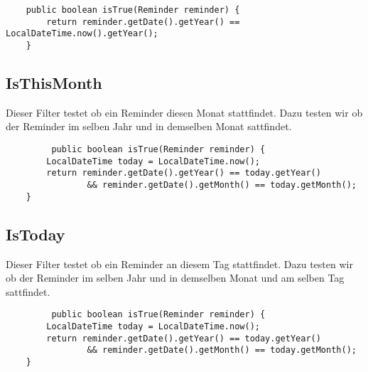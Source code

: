     \begin{lstlisting}
    public boolean isTrue(Reminder reminder) {
        return reminder.getDate().getYear() == LocalDateTime.now().getYear();
    }
    \end{lstlisting}


    \subsection{IsThisMonth}
    Dieser Filter testet ob ein Reminder diesen Monat stattfindet. Dazu  testen wir ob der Reminder im selben Jahr und in demselben Monat sattfindet.
    \begin{lstlisting}
         public boolean isTrue(Reminder reminder) {
        LocalDateTime today = LocalDateTime.now();
        return reminder.getDate().getYear() == today.getYear()
                && reminder.getDate().getMonth() == today.getMonth();
    }
    \end{lstlisting}

    \subsection{IsToday}

    Dieser Filter testet ob ein Reminder an diesem Tag stattfindet. Dazu testen wir ob der Reminder im selben Jahr und in demselben Monat und am selben Tag sattfindet.
    \begin{lstlisting}
         public boolean isTrue(Reminder reminder) {
        LocalDateTime today = LocalDateTime.now();
        return reminder.getDate().getYear() == today.getYear()
                && reminder.getDate().getMonth() == today.getMonth();
    }
    \end{lstlisting}
